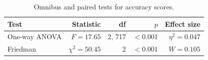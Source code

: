 \begin{table}[H]
\caption{Omnibus and paired tests for accuracy scores.}
\label{tab:accuracy:tests}
\centering
\begin{tabular}{lrrrr}
\toprule
Test & Statistic & df & $p$ & Effect size \\
\midrule
One-way ANOVA & $F = 17.65$ & 2, 717 & $<0.001$ & $\eta^2 = 0.047$ \\
Friedman & $\chi^2 = 50.45$ & 2 & $<0.001$ & $W = 0.105$ \\
\bottomrule
\end{tabular}
\end{table}

